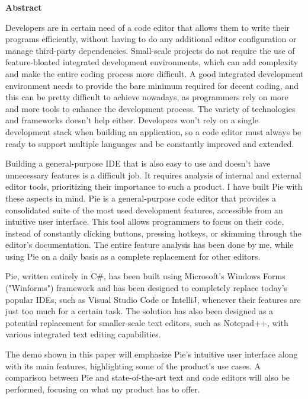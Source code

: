 \thispagestyle{pagestyle}

\begin{center}
    \textbf{\fontsize{20pt}{24pt} \selectfont Abstract}
\end{center}

Developers are in certain need of a code editor that allows them to write their programs efficiently, without having to do any additional editor configuration or manage third-party dependencies. Small-scale projects do not require the use of feature-bloated integrated development environments, which can add complexity and make the entire coding process more difficult. A good integrated development environment needs to provide the bare minimum required for decent coding, and this can be pretty difficult to achieve nowadays, as programmers rely on more and more tools to enhance the development process. The variety of technologies and frameworks doesn't help either. Developers won't rely on a single development stack when building an application, so a code editor must always be ready to support multiple languages and be constantly improved and extended.

Building a general-purpose IDE that is also easy to use and doesn't have unnecessary features is a difficult job. It requires analysis of internal and external editor tools, prioritizing their importance to such a product. I have built Pie with these aspects in mind. Pie is a general-purpose code editor that provides a consolidated suite of the most used development features, accessible from an intuitive user interface. This tool allows programmers to focus on their code, instead of constantly clicking buttons, pressing hotkeys, or skimming through the editor's documentation. The entire feature analysis has been done by me, while using Pie on a daily basis as a complete replacement for other editors.

Pie, written entirely in C\#, has been built using Microsoft's Windows Forms ("Winforms") framework and has been designed to completely replace today's popular IDEs, such as Visual Studio Code or IntelliJ, whenever their features are just too much for a certain task. The solution has also been designed as a potential replacement for smaller-scale text editors, such as Notepad++, with various integrated text editing capabilities.

The demo shown in this paper will emphasize Pie's intuitive user interface along with its main features, highlighting some of the product's use cases. A comparison between Pie and state-of-the-art text and code editors will also be performed, focusing on what my product has to offer.
\vfill